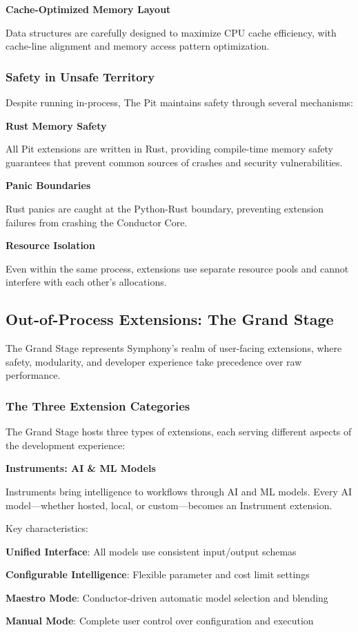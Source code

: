 \textbf{Cache-Optimized Memory Layout}

Data structures are carefully designed to maximize CPU cache efficiency, with cache-line alignment and memory access pattern optimization.

\subsubsection{Safety in Unsafe Territory}

Despite running in-process, The Pit maintains safety through several mechanisms:

\textbf{Rust Memory Safety}

All Pit extensions are written in Rust, providing compile-time memory safety guarantees that prevent common sources of crashes and security vulnerabilities.

\textbf{Panic Boundaries}

Rust panics are caught at the Python-Rust boundary, preventing extension failures from crashing the Conductor Core.

\textbf{Resource Isolation}

Even within the same process, extensions use separate resource pools and cannot interfere with each other's allocations.

\subsection{Out-of-Process Extensions: The Grand Stage}
\label{subsec:out-of-process-extensions-grand-stage}

The Grand Stage represents Symphony's realm of user-facing extensions, where safety, modularity, and developer experience take precedence over raw performance.

\subsubsection{The Three Extension Categories}

The Grand Stage hosts three types of extensions, each serving different aspects of the development experience:

\textbf{Instruments: AI \& ML Models}

Instruments bring intelligence to workflows through AI and ML models. Every AI model—whether hosted, local, or custom—becomes an Instrument extension.

Key characteristics:
\begin{compactlist}
    \item \textbf{Unified Interface}: All models use consistent input/output schemas
    \item \textbf{Configurable Intelligence}: Flexible parameter and cost limit settings
    \item \textbf{Maestro Mode}: Conductor-driven automatic model selection and blending
    \item \textbf{Manual Mode}: Complete user control over configuration and execution
\end{compactlist}

